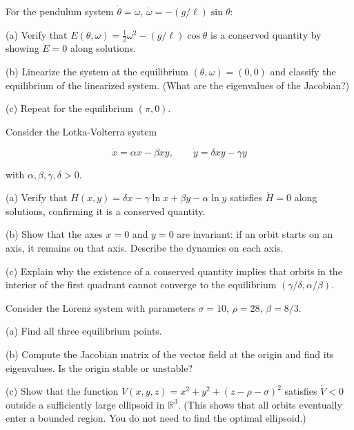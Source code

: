 \begin{exercise}
For the pendulum system $\dot{\theta} = \omega$, $\dot{\omega} = -(g/\ell)\sin\theta$:

(a) Verify that $E(\theta, \omega) = \frac{1}{2}\omega^2 - (g/\ell)\cos\theta$ is a conserved quantity by showing $\dot{E} = 0$ along solutions.

(b) Linearize the system at the equilibrium $(\theta, \omega) = (0, 0)$ and classify the equilibrium of the linearized system. (What are the eigenvalues of the Jacobian?)

(c) Repeat for the equilibrium $(\pi, 0)$.


\bigskip

\end{exercise}


\begin{exercise}
Consider the Lotka-Volterra system

\[
\dot{x} = \alpha x - \beta xy, \qquad \dot{y} = \delta xy - \gamma y
\]

with $\alpha, \beta, \gamma, \delta > 0$.

(a) Verify that $H(x, y) = \delta x - \gamma \ln x + \beta y - \alpha \ln y$ satisfies $\dot{H} = 0$ along solutions, confirming it is a conserved quantity.

(b) Show that the axes $x = 0$ and $y = 0$ are invariant: if an orbit starts on an axis, it remains on that axis. Describe the dynamics on each axis.

(c) Explain why the existence of a conserved quantity implies that orbits in the interior of the first quadrant cannot converge to the equilibrium $(\gamma/\delta, \alpha/\beta)$.


\bigskip

\end{exercise}


\begin{exercise}
Consider the Lorenz system with parameters $\sigma = 10$, $\rho = 28$, $\beta = 8/3$.

(a) Find all three equilibrium points.

(b) Compute the Jacobian matrix of the vector field at the origin and find its eigenvalues. Is the origin stable or unstable?

(c) Show that the function $V(x, y, z) = x^2 + y^2 + (z - \rho - \sigma)^2$ satisfies $\dot{V} < 0$ outside a sufficiently large ellipsoid in $\mathbb{R}^3$. (This shows that all orbits eventually enter a bounded region. You do not need to find the optimal ellipsoid.)


\bigskip

\end{exercise}


